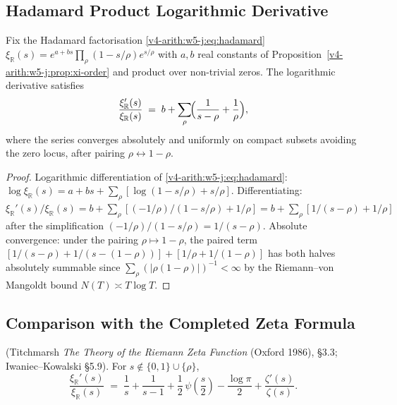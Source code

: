 \subsection{Hadamard Product Logarithmic Derivative}
\label{v4-arith:w7-g:hadamard-formula:log-derivative}

\begin{lemma}
\label{v4-arith:w7-g:lem:hadamard-log-deriv}
Fix the Hadamard factorisation
\eqref{v4-arith:w5-j:eq:hadamard}
\(\xi_{\mathbb{R}}(s)=e^{a+bs}\prod_{\rho}(1-s/\rho)e^{s/\rho}\) with
\(a,b\) real constants of Proposition~\ref{v4-arith:w5-j:prop:xi-order} and product
over non-trivial zeros. The logarithmic derivative satisfies
\begin{equation}
\label{v4-arith:w7-g:eq:log-deriv-Hadamard}
\frac{\xi_{\mathbb{R}}'(s)}{\xi_{\mathbb{R}}(s)}
\;=\;b+\sum_{\rho}\!\Bigl(\frac{1}{s-\rho}+\frac{1}{\rho}\Bigr),
\end{equation}
where the series converges absolutely and uniformly on compact subsets
avoiding the zero locus, after pairing \(\rho\leftrightarrow 1-\rho\).
\end{lemma}

\begin{proof}
Logarithmic differentiation of \eqref{v4-arith:w5-j:eq:hadamard}:
\(\log\xi_{\mathbb{R}}(s)=a+bs+\sum_{\rho}[\log(1-s/\rho)+s/\rho]\).
Differentiating:
\(\xi_{\mathbb{R}}'(s)/\xi_{\mathbb{R}}(s)=b+\sum_{\rho}[(-1/\rho)/(1-s/\rho)+1/\rho]
=b+\sum_{\rho}[1/(s-\rho)+1/\rho]\) after the simplification
\((-1/\rho)/(1-s/\rho)=1/(s-\rho)\). Absolute convergence: under the
pairing \(\rho\mapsto 1-\rho\), the paired term
\([1/(s-\rho)+1/(s-(1-\rho))]+[1/\rho+1/(1-\rho)]\) has both halves
absolutely summable since
\(\sum_{\rho}(|\rho(1-\rho)|)^{-1}<\infty\) by the Riemann--von Mangoldt
bound \(N(T)\asymp T\log T\).
\end{proof}

\subsection{Comparison with the Completed Zeta Formula}
\label{v4-arith:w7-g:hadamard-formula:comparison}

\begin{proposition}
\label{v4-arith:w7-g:prop:xi-over-xi-explicit}
\ClaimStatusProvedElsewhere (Titchmarsh \emph{The Theory of the
Riemann Zeta Function} (Oxford 1986), \S3.3; Iwaniec--Kowalski \S5.9).
For \(s\notin\{0,1\}\cup\{\rho\}\),
\begin{equation}
\label{v4-arith:w7-g:eq:xi-over-xi-split}
\frac{\xi_{\mathbb{R}}'(s)}{\xi_{\mathbb{R}}(s)}
\;=\;\frac{1}{s}+\frac{1}{s-1}+\frac{1}{2}\,\psi\!\left(\frac{s}{2}\right)-\frac{\log\pi}{2}+\frac{\zeta'(s)}{\zeta(s)}.
\end{equation}
\end{proposition}

